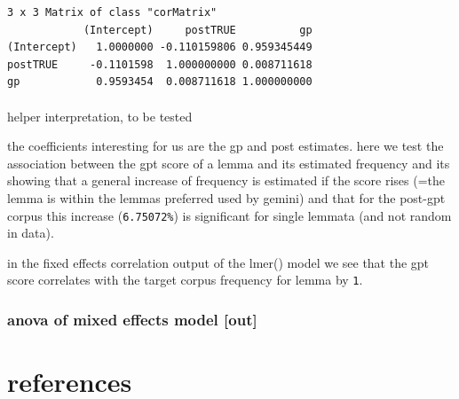\documentclass[
  letterpaper,
  DIV=11,
  numbers=noendperiod]{scrartcl}
\makeatletter
\let\oldparagraph\paragraph
\renewcommand{\paragraph}{
    \@ifstar
      \xxxParagraphStar
      \xxxParagraphNoStar
  }
\newcommand{\xxxParagraphStar}[1]{\oldparagraph*{#1}\mbox{}}
\newcommand{\xxxParagraphNoStar}[1]{\oldparagraph{#1}\mbox{}}
\makeatother
\begin{document}
\begin{verbatim}
3 x 3 Matrix of class "corMatrix"
            (Intercept)     postTRUE          gp
(Intercept)   1.0000000 -0.110159806 0.959345449
postTRUE     -0.1101598  1.000000000 0.008711618
gp            0.9593454  0.008711618 1.000000000
\end{verbatim}

\paragraph{helper interpretation, to be
tested}\label{helper-interpretation-to-be-tested}

the coefficients interesting for us are the gp and post estimates. here
we test the association between the gpt score of a lemma and its
estimated frequency and its showing that a general increase of frequency
is estimated if the score rises (=the lemma is within the lemmas
preferred used by gemini) and that for the post-gpt corpus this increase
(\texttt{6.75072\%}) is significant for single lemmata (and not random
in data).

in the fixed effects correlation output of the lmer() model we see that
the gpt score correlates with the target corpus frequency for lemma by
\texttt{1}.

\subsubsection{anova of mixed effects model
{[}out{]}}\label{anova-of-mixed-effects-model-out}

\section*{references}\label{references}
\end{document}

